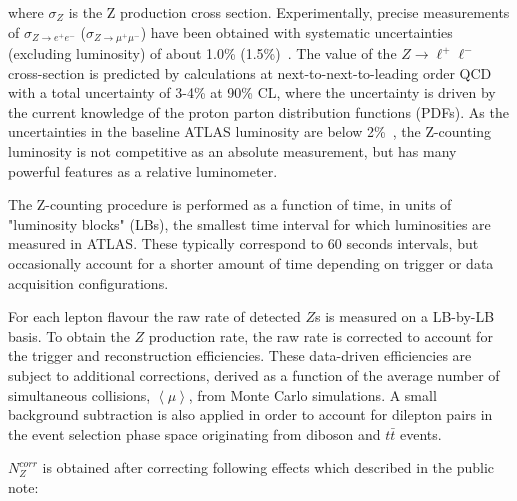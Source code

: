 where $\sigma_Z$ is the Z production cross section. Experimentally, precise measurements of $\sigma_{Z\rightarrow e^+e^-}$ ($\sigma_{Z\rightarrow \mu^+\mu^-}$) have been obtained with systematic uncertainties (excluding luminosity) of about 1.0\% (1.5\%)~\cite{ATLAS:2019zci}. The value of the $Z\rightarrow \ell^+\ell^-$ cross-section is predicted by calculations at next-to-next-to-leading order QCD with a total uncertainty of 3-4\% at 90\% CL, where the uncertainty is driven by the current knowledge of the proton parton distribution functions (PDFs). As the uncertainties in the baseline ATLAS luminosity are below 2\%~\cite{ATLAS-CONF-2019-021}, the Z-counting luminosity is not competitive as an absolute measurement, but has many powerful features as a relative luminometer.

The Z-counting procedure is performed as a function of time, in units of "luminosity blocks" (LBs), the smallest time interval for which luminosities are measured in ATLAS. These typically correspond to 60 seconds intervals, but occasionally account for a shorter amount of time depending on trigger or data acquisition configurations.

For each lepton flavour the raw rate of detected $Z$s is measured on a LB-by-LB basis. To obtain the $Z$ production rate, the raw rate is corrected to account for the trigger and reconstruction efficiencies. These data-driven efficiencies are subject to additional corrections, derived as a function of the average number of simultaneous collisions, $\left< \mu \right>$, from Monte Carlo simulations. A small background subtraction is also applied in order to account for dilepton pairs in the event selection phase space originating from diboson and $t\bar{t}$ events.


$N_Z^{corr}$ is obtained after correcting following effects which described in the public note\cite{ATL-DAPR-PUB-2021-001}:

